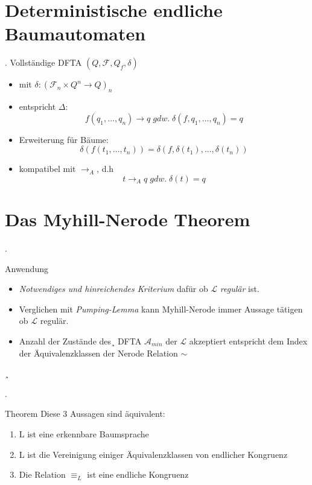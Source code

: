 \documentclass[11pt]{beamer}
\makeatletter
\newcommand*{\currentsection}{\@currentlabelname}
\makeatother
\begin{document}
\section{Deterministische endliche Baumautomaten}
\begin{frame}{\thesection. \currentsection}
Vollständige DFTA $(Q,\mathcal{F},Q_f,\delta)$
\begin{itemize}
	\item mit $\delta : (\mathcal{F}_n \times Q^{n} \rightarrow Q)_n $
	\item entspricht $\Delta$:
	$$ f(q_1,...,q_n) \rightarrow q \; gdw. \; \delta(f, q_1,...,q_n) = q  $$
	\item Erweiterung für Bäume:
	$$ \delta(f(t_1,...,t_n)) = \delta(f, \delta(t_1),...,\delta(t_n))$$
	\item kompatibel mit $\rightarrow_A$, d.h
	$$ t \rightarrow_A q \; gdw. \; \delta(t) = q $$
\end{itemize}
\end{frame}


\section{Das Myhill-Nerode Theorem}
\begin{frame}{\thesection. \currentsection}
\begin{block}{Anwendung}
	\begin{itemize}
		\item \textit{Notwendiges und hinreichendes Kriterium} dafür ob $\mathcal{L}$ \textit{regulär} ist.
		\item Verglichen mit \textit{Pumping-Lemma} kann Myhill-Nerode immer Aussage tätigen ob $\mathcal{L}$ regulär.
		\item Anzahl der Zustände des¸ DFTA $\mathcal{A}_{min}$ der $\mathcal{L}$ akzeptiert entspricht dem Index der Äquivalenzklassen der Nerode Relation $\sim$
	\end{itemize}
\end{block}¸
\end{frame}

\begin{frame}{\thesection. \currentsection}
\begin{block}{Theorem}
	Diese 3 Aussagen sind äquivalent:
	\begin{enumerate}
		\item L ist eine erkennbare Baumsprache
		\item L ist die Vereinigung einiger Äquivalenzklassen von endlicher Kongruenz
		\item Die Relation \mbox{$ \equiv_L $} ist eine endliche Kongruenz
	\end{enumerate}
\end{block}
\end{frame}
\end{document}
